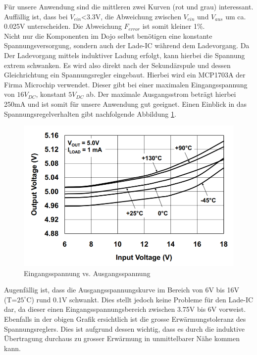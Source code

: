 Für unsere Anwendung sind die mittleren zwei Kurven (rot und grau) interessant. Auffällig ist, dass bei $V_{ein}$<3.3V, die Abweichung zwischen $V_{ein}$ und $V_{aus}$ um ca. 0.025V unterscheiden. Die Abweichung $F_{error}$ ist somit kleiner 1$\%$.
\\
Nicht nur die Komponenten im Dojo selbst benötigen eine konstante Spannungsversorgung, sondern auch der Lade-IC während dem Ladevorgang. Da Der Ladevorgang mittels induktiver Ladung erfolgt, kann hierbei die Spannung extrem schwanken. Es wird also direkt nach der Sekundärspule und dessen Gleichrichtung ein Spannungsregler eingebaut. Hierbei wird ein MCP1703A der Firma Microchip verwendet. Dieser gibt bei einer maximalen Eingangsspannung von $16V_{DC}$, konstant $5V_{DC}$ ab. Der maximale Ausgangsstrom beträgt hierbei 250mA und ist somit für unsere Anwendung gut geeignet. Einen Einblick in das Spannungsregelverhalten gibt nachfolgende Abbildung \ref{fig:Linearregler 5V}.

\begin{figure}[H]
	\begin{center}
		\includegraphics[width=120mm]{data/Linearregler_5V.png}
		\caption[MCP1703A Linearregler Spannungsverhalten]{Eingangsspannung vs. Ausgangsspannung \cite{MCP1703LinearRegulator}} %
		\label{fig:Linearregler 5V}
	\end{center}
\end{figure} 

Augenfällig ist, dass die Ausgangsspannungskurve im Bereich von 6V bis 16V (T=$25^\circ\text{C}$) rund 0.1V schwankt. Dies stellt jedoch keine Probleme für den Lade-IC dar, da dieser einen Eingangsspannungsbereich zwischen 3.75V bis 6V vorweist. Ebenfalls in der obigen Grafik ersichtlich ist die grosse Erwärmungstoleranz des Spannungsreglers. Dies ist aufgrund dessen wichtig, dass es durch die induktive Übertragung durchaus zu grosser Erwärmung in unmittelbarer Nähe kommen kann.

